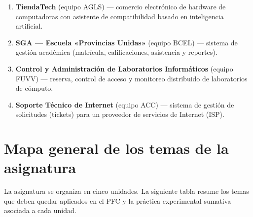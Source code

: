 \documentclass[11pt]{article}
\begin{document}
\begin{enumerate}[leftmargin=1.5em,itemsep=2pt]
\item \textbf{TiendaTech} (equipo AGLS) --- comercio electrónico de hardware de computadoras con asistente de compatibilidad basado en inteligencia artificial.
\item \textbf{SGA --- Escuela «Provincias Unidas»} (equipo BCEL) --- sistema de gestión académica (matrícula, calificaciones, asistencia y reportes).
\item \textbf{Control y Administración de Laboratorios Informáticos} (equipo FUVV) --- reserva, control de acceso y monitoreo distribuido de laboratorios de cómputo.
\item \textbf{Soporte Técnico de Internet} (equipo ACC) --- sistema de gestión de solicitudes (tickets) para un proveedor de servicios de Internet (ISP).
\end{enumerate}

\section{Mapa general de los temas de la asignatura}
La asignatura se organiza en cinco unidades. La siguiente tabla resume los temas que deben quedar aplicados
en el PFC y la práctica experimental sumativa asociada a cada unidad.
\end{document}

